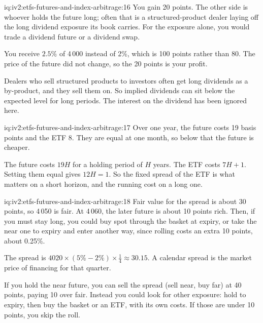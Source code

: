 \begin{solution}{iq:iv2:etfs-futures-and-index-arbitrage:16}
You gain 20 points. The other side is whoever holds the future long; often that is a structured-product dealer laying off the long dividend exposure its book carries. For the exposure alone, you would trade a dividend future or a dividend swap.

You receive $2.5\%$ of 4\,000 instead of 2\%, which is 100 points rather than 80. The price of the future did not change, so the 20 points is your profit.

Dealers who sell structured products to investors often get long dividends as a by-product, and they sell them on. So implied dividends can sit below the expected level for long periods. The interest on the dividend has been ignored here.

\end{solution}

\begin{solution}{iq:iv2:etfs-futures-and-index-arbitrage:17}
Over one year, the future costs 19 basis points and the ETF 8. They are equal at one month, so below that the future is cheaper.

The future costs $19H$ for a holding period of $H$ years. The ETF costs $7H + 1$. Setting them equal gives $12H = 1$. So the fixed spread of the ETF is what matters on a short horizon, and the running cost on a long one.

\end{solution}

\begin{solution}{iq:iv2:etfs-futures-and-index-arbitrage:18}
Fair value for the spread is about 30 points, so 4\,050 is fair. At 4\,060, the later future is about 10 points rich. Then, if you must stay long, you could buy spot through the basket at expiry, or take the near one to expiry and enter another way, since rolling costs an extra 10 points, about 0.25\%.

The spread is $4020 \times (5\% - 2\%) \times \tfrac14 \approx 30.15$. A calendar spread is the market price of financing for that quarter.

If you hold the near future, you can sell the spread (sell near, buy far) at 40 points, paying 10 over fair. Instead you could look for other exposure: hold to expiry, then buy the basket or an ETF, with its own costs. If those are under 10 points, you skip the roll.

\end{solution}

